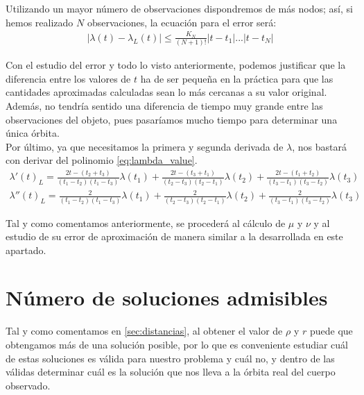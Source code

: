 \documentclass[11pt]{book}
\newcommand\ddfrac[2]{\frac{\displaystyle #1}{\displaystyle #2}}
\begin{document}
Utilizando un mayor número de observaciones dispondremos de más nodos; así, si hemos realizado $N$ observaciones, la ecuación para el error será:
\begin{align}
|\lambda(t)-\lambda_L(t)|\leq\ddfrac{K_N}{(N+1)!}|t-t_1|...|t-t_N|
\label{eq:interpolation_error_n_observations}
\end{align}

Con el estudio del error y todo lo visto anteriormente, podemos justificar que la diferencia entre los valores de $t$ ha de ser pequeña en la práctica para que las cantidades aproximadas calculadas sean lo más cercanas a su valor original. Además, no tendría sentido una diferencia de tiempo muy grande entre las observaciones del objeto, pues pasaríamos mucho tiempo para determinar una única órbita.\\

Por último, ya que necesitamos la primera y segunda derivada de $\lambda$, nos bastará con derivar del polinomio \eqref{eq:lambda_value}.
\begin{align*}
\lambda'(t)_L = \frac{2t-(t_2+t_3)}{(t_1-t_2)(t_1-t_3)}\lambda(t_1)
+\frac{2t-(t_3+t_1)}{(t_2-t_3)(t_2-t_1)}\lambda(t_2)
+\frac{2t-(t_1+t_2)}{(t_3-t_1)(t_3-t_2)}\lambda(t_3)\\
\lambda''(t)_L = \frac{2}{(t_1-t_2)(t_1-t_3)}\lambda(t_1)
+\frac{2}{(t_2-t_3)(t_2-t_1)}\lambda(t_2)
+\frac{2}{(t_3-t_1)(t_3-t_2)}\lambda(t_3)
\end{align*}

Tal y como comentamos anteriormente, se procederá al cálculo de $\mu$ y $\nu$ y al estudio de su error de aproximación de manera similar a la desarrollada en este apartado.\\

\newpage
\thispagestyle{empty}








\chapter{Número de soluciones admisibles}
\label{chap:soluciones_admisibles}
Tal y como comentamos en \ref{sec:distancias}, al obtener el valor de $\rho$ y $r$ puede que obtengamos más de una solución posible, por lo que es conveniente estudiar cuál de estas soluciones es válida para nuestro problema y cuál no, y dentro de las válidas determinar cuál es la solución que nos lleva a la órbita real del cuerpo observado.\\
\end{document}

